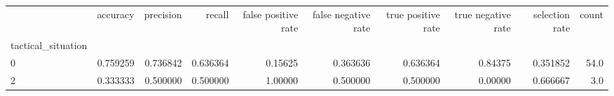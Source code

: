 \begin{tabular}{lrrrrrrrrr}
\toprule
{} &  accuracy &  precision &    recall &  false positive rate &  false negative rate &  true positive rate &  true negative rate &  selection rate &  count \\
tactical\_situation &           &            &           &                      &                      &                     &                     &                 &        \\
\midrule
0                  &  0.759259 &   0.736842 &  0.636364 &              0.15625 &             0.363636 &            0.636364 &             0.84375 &        0.351852 &   54.0 \\
2                  &  0.333333 &   0.500000 &  0.500000 &              1.00000 &             0.500000 &            0.500000 &             0.00000 &        0.666667 &    3.0 \\
\bottomrule
\end{tabular}

